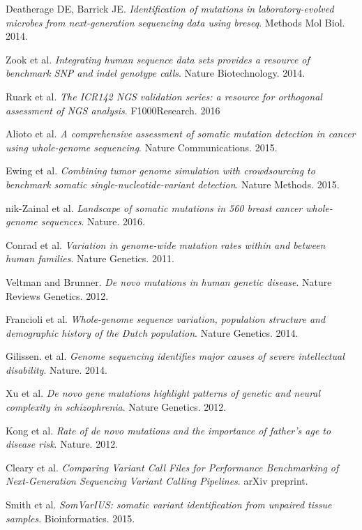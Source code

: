 \documentclass[notitlepage, twocolumn]{article}
\begin{document}
\begin{thebibliography}{9}
Deatherage DE, Barrick JE. 
\textit{Identification of mutations in laboratory-evolved microbes from next-generation sequencing data using breseq}. 
Methods Mol Biol. 2014.

Zook et al.
\textit{Integrating human sequence data sets provides a resource of benchmark SNP and indel genotype calls}.
Nature Biotechnology. 2014.

Ruark et al.
\textit{The ICR142 NGS validation series: a resource for orthogonal assessment of NGS analysis}.
F1000Research. 2016

Alioto et al.
\textit{A comprehensive assessment of somatic mutation detection in cancer using whole-genome sequencing}.
Nature Communications. 2015.

Ewing et al.
\textit{Combining tumor genome simulation with crowdsourcing to benchmark somatic single-nucleotide-variant detection}.
Nature Methods. 2015.

nik-Zainal et al.
\textit{Landscape of somatic mutations in 560 breast cancer whole-genome sequences}.
Nature. 2016.

Conrad et al.
\textit{Variation in genome-wide mutation rates within and between human families}.
Nature Genetics. 2011.

Veltman and Brunner.
\textit{De novo mutations in human genetic disease}.
Nature Reviews Genetics. 2012.

Francioli et al.
\textit{Whole-genome sequence variation, population structure and demographic history of the Dutch population}.
Nature Genetics. 2014.

Gilissen. et al.
\textit{Genome sequencing identifies major causes of severe intellectual disability}.
Nature. 2014.

Xu et al.
\textit{De novo gene mutations highlight patterns of genetic and neural complexity in schizophrenia}.
Nature Genetics. 2012.

Kong et al.
\textit{Rate of de novo mutations and the importance of father’s age to disease risk}.
Nature. 2012.

Cleary et al.
\textit{Comparing Variant Call Files for Performance Benchmarking of Next-Generation Sequencing Variant Calling Pipelines}.
arXiv preprint.

Smith et al.
\textit{SomVarIUS: somatic variant identification from unpaired tissue samples}.
Bioinformatics. 2015.


\end{thebibliography}
\end{document}
